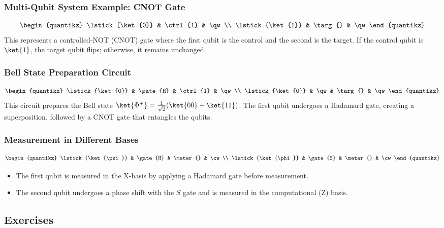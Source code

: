\subsubsection*{Multi-Qubit System Example: CNOT Gate}
\[
\begin{quantikz}
    \lstick{\ket{0}} & \ctrl{1} & \qw \\
    \lstick{\ket{1}} & \targ{}  & \qw
\end{quantikz}
\]
This represents a controlled-NOT (CNOT) gate where the first qubit is the
control and the second is the target. If the control qubit is $\ket{1}$, the
target qubit flips; otherwise, it remains unchanged.

\subsubsection*{Bell State Preparation Circuit}
\[
\begin{quantikz}
    \lstick{\ket{0}} & \gate{H} & \ctrl{1} & \qw \\
    \lstick{\ket{0}} & \qw      & \targ{}  & \qw
\end{quantikz}
\]
This circuit prepares the Bell state $\ket{\Phi^+} = \frac{1}{\sqrt{2}}(\ket{00} + \ket{11})$. The first qubit undergoes a Hadamard gate, creating a superposition, followed by a CNOT gate that entangles the qubits.

\subsubsection*{Measurement in Different Bases}
\[
\begin{quantikz}
    \lstick{\ket{\psi}} & \gate{H} & \meter{} & \cw \\
    \lstick{\ket{\phi}} & \gate{S} & \meter{} & \cw
\end{quantikz}
\]

\begin{itemize}
  \item The first qubit is measured in the X-basis by applying a Hadamard
    gate before measurement.
  \item The second qubit undergoes a phase shift with the $S$ gate and is
    measured in the computational (Z) basis.
\end{itemize}

\vspace{0.3cm}

\subsection*{Exercises}

